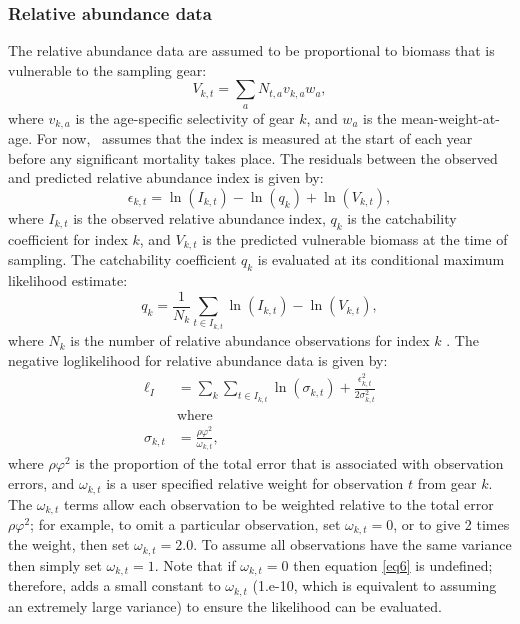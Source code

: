 \begin{multicols}{2}
\subsubsection{Relative abundance data}
The relative abundance data are assumed to be proportional to biomass that is vulnerable to the sampling gear:
\begin{equation}\label{eq4}
 V_{k,t} = \sum_a N_{t,a} v_{k,a} w_a,
\end{equation}
where $v_{k,a}$ is the age-specific selectivity of gear $k$, and $w_a$ is the mean-weight-at-age.  For now, \iscam\ assumes that the index is measured at the start of each year before any significant mortality takes place.  The residuals between the observed and predicted relative abundance index is given by:
\begin{equation}\label{eq5}
\epsilon_{k,t} = \ln(I_{k,t}) - \ln(q_k)+\ln(V_{k,t}),
\end{equation}
where $I_{k,t}$ is the observed relative abundance index, $q_k$ is the catchability coefficient for index $k$, and $V_{k,t}$ is the predicted vulnerable biomass at the time of sampling.  The catchability coefficient $q_k$ is evaluated at its conditional maximum likelihood estimate:
\[
  q_k =\frac{1}{N_k} \sum_{t \in I_{k,t}} \ln(I_{k,t}) - \ln(V_{k,t}),
\]
where $N_k$ is the number of relative abundance observations for index $k$ \citep[see][for more information]{walters1994calculation}. The negative loglikelihood for relative abundance data is given by:
\begin{align}
\ell_I &= \sum_k \sum_{t \in I_{k,t}}  \ln(\sigma_{k,t})+\frac{\epsilon_{k,t}^2}{2\sigma_{k,t}^2} \label{eq6}\\
&\mbox{where}\nonumber\\
\sigma_{k,t} &= \frac{\rho \varphi^2}{ \omega_{k,t}},  \nonumber
\end{align}
where $\rho \varphi^2$ is the proportion of the total error that is associated with observation errors, and $\omega_{k,t}$ is a user specified relative weight for observation $t$ from gear $k$.  The $ \omega_{k,t}$ terms allow each observation to be weighted relative to the total error $\rho \varphi^2$; for example, to omit a particular observation, set $\omega_{k,t}=0$, or to give 2 times the weight, then set  $\omega_{k,t}=2.0$. To assume all observations have the same variance then simply set  $\omega_{k,t}=1$.  Note that if  $\omega_{k,t}=0$ then equation \eqref{eq6} is undefined; therefore, \iscam adds a small constant to  $\omega_{k,t}$ (1.e-10, which is equivalent to assuming an extremely large variance)  to ensure the likelihood can be evaluated.


\end{multicols}

